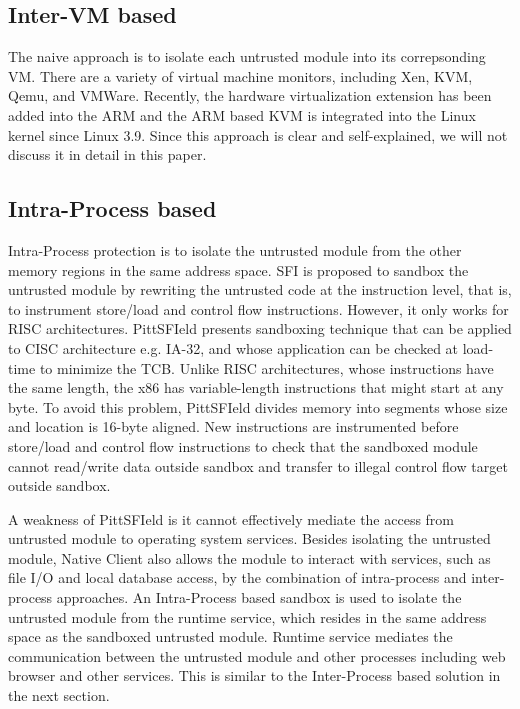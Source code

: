 \subsection{Inter-VM based}
\label{sec:problem2:inter-vm}

The naive approach is to isolate each untrusted module into its correpsonding
VM. There are a variety of virtual machine monitors, including Xen, KVM, Qemu,
and VMWare.  Recently, the hardware virtualization extension has been added into
the ARM and the ARM based KVM \cite{KVM/ARM} is integrated into the Linux kernel
since Linux 3.9. Since this approach is clear and self-explained, we will not
discuss it in detail in this paper.

\subsection{Intra-Process based}
\label{sec:problem2:intra-process}

Intra-Process protection is to isolate the untrusted module from the other
memory regions in the same address space. SFI \cite{SFI} is proposed to sandbox
the untrusted module by rewriting the untrusted code at the instruction level,
that is, to instrument store/load and control flow instructions. However, it
only works for RISC architectures. PittSFIeld \cite{PittSFIeld} presents
sandboxing technique that can be applied to CISC architecture e.g. IA-32, and
whose application can be checked at load-time to minimize the TCB.  Unlike RISC
architectures, whose instructions have the same length, the x86 has
variable-length instructions that might start at any byte. To avoid this
problem, PittSFIeld divides memory into segments whose size and location is
16-byte aligned.  New instructions are instrumented before store/load and
control flow instructions to check that the sandboxed module cannot read/write
data outside sandbox and transfer to illegal control flow target outside
sandbox.

A weakness of PittSFIeld is it cannot effectively mediate the access from
untrusted module to operating system services. Besides isolating the untrusted
module, Native Client \cite{NaCl} also allows the module to interact
with services, such as file I/O and local database access, by the combination of
intra-process and inter-process approaches.  An Intra-Process based sandbox is
used to isolate the untrusted module from the runtime service, which resides in
the same address space as the sandboxed untrusted module. Runtime service
mediates the communication between the untrusted module and other processes
including web browser and other services. This is similar to the Inter-Process
based solution in the next section.


